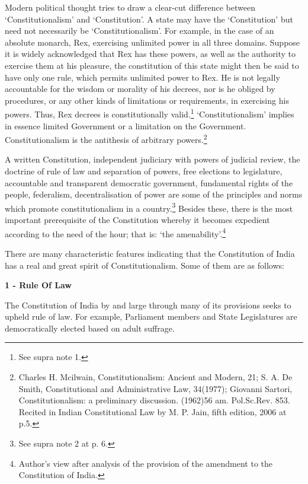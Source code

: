 \begin{multicols}{2}
\noi
Modern political thought tries to draw a clear-cut difference between ‘Constitutionalism’ and
‘Constitution’. A state may have the ‘Constitution’ but need not necessarily be ‘Constitutionalism’.
For example, in the case of an absolute monarch, Rex, exercising unlimited power in all three
domains. Suppose it is widely acknowledged that Rex has these powers, as well as the authority
to exercise them at his pleasure, the constitution of this state might then be said to have only one
rule, which permits unlimited power to Rex. He is not legally accountable for the wisdom or
morality of his decrees, nor is he obliged by procedures, or any other kinds of limitations or
requirements, in exercising his powers. Thus, Rex decrees is constitutionally valid.\footnote{See supra note 1.} ‘Constitutionalism’ implies in essence limited Government or a limitation on the Government.
Constitutionalism is the antithesis of arbitrary powers.\footnote{Charles H. Mcilwain, Constitutionalism: Ancient and Modern, 21; S. A. De Smith, Constitutional and Administrative Law, 34(1977); Giovanni Sartori, Constitutionalism: a preliminary discussion. (1962)56 am. Pol.Sc.Rev. 853. Recited in Indian Constitutional Law by M. P. Jain, fifth edition, 2006 at p.5.}


\noi
A written Constitution, independent judiciary with powers of judicial review, the doctrine of rule
of law and separation of powers, free elections to legislature, accountable and transparent
democratic government, fundamental rights of the people, federalism, decentralisation of power
are some of the principles and norms which promote constitutionalism in a country.\footnote{See supra note 2 at p. 6.} Besides these, there is the most important prerequisite of the Constitution whereby it becomes expedient according to the need of the hour; that is: ‘the amenability’.\footnote{Author's view after analysis of the provision of the amendment to the Constitution of India.}

\noi
There are many characteristic features indicating that the Constitution of India has a real and great
spirit of Constitutionalism. Some of them are as follows:

\vspace{-.1cm}

\noi
{\large \bfseries 1 - Rule Of Law}

\noi
The Constitution of India by and large through many of its provisions seeks to upheld rule of law.
For example, Parliament members and State Legislatures are democratically elected based on
adult suffrage.


\end{multicols}
